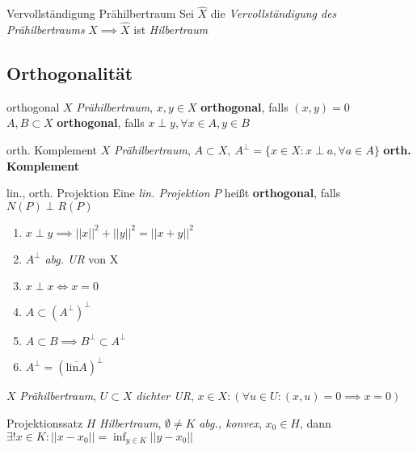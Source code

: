 \begin{satz}{Vervollständigung Prähilbertraum}
  Sei $\hat{X}$ die \textit{Vervollständigung des Prähilbertraums}
  $X \implies \hat{X}$ ist \textit{Hilbertraum}
\end{satz}


\subsection{Orthogonalität}

\begin{definition}{orthogonal}
  $X$ \textit{Prähilbertraum}, $x,y \in X$ \textbf{orthogonal},
  falls $(x,y) = 0$\\
  $A,B \subset X$ \textbf{orthogonal}, falls $x \perp y, \forall x\in A, y\in B$
\end{definition}

\begin{definition}{orth. Komplement}
  $X$ \textit{Prähilbertraum}, $A \subset X,\ A^\perp = \{x\in X: x \perp a,
  \forall a\in A\}$ \textbf{orth. Komplement}
\end{definition}

\begin{definition}{lin., orth. Projektion}
  Eine \textit{lin. Projektion} $P$ heißt \textbf{orthogonal},
  falls $N(P) \perp R(P)$
\end{definition}

\begin{bemerkung}
  \begin{enumerate}[label=(\roman*)]
    \item $x \perp y \implies ||x||^2 + ||y||^2 = ||x+y||^2$
    \item $A^\perp$ \textit{abg. UR} von X
    \item $x \perp x \Leftrightarrow x = 0$
    \item $A \subset (A^\perp)^\perp$
    \item $A \subset B \implies B^\perp \subset A^\perp$
    \item $A^\perp = (\overline{\text{lin}A})^\perp$
  \end{enumerate}
\end{bemerkung}

\begin{lemma}
  $X$ \textit{Prähilbertraum}, $U \subset X$ \textit{dichter UR}, $x\in X:
  (\forall u \in U: (x,u)=0 \implies x =0)$
\end{lemma}

\begin{satz}{Projektionssatz}
  $H$ \textit{Hilbertraum}, $\emptyset \neq K$ \textit{abg., konvex},
  $x_0 \in H$,
  dann $\exists ! x\in K: ||x- x_0|| = \inf_{y \in K}||y -x_0||$
\end{satz}

